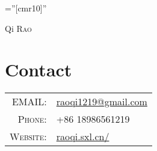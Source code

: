\documentclass[a4paper,10pt]{article}
\begin{document}

\pagestyle{empty} %

\font\fb=''[cmr10]'' %

\par{\centering
		{\Huge Qi \textsc{Rao}
	}\bigskip\par}

\section{Contact}

\begin{tabular}{rl}
    \textsc{EMAIL:} & \href{mailto:raoqi1219@gmail.com}{raoqi1219@gmail.com}\\
    \textsc{Phone:}     & +86 18986561219\\
    \textsc{Website:}     & \href{http://raoqi.sxl.cn/}{raoqi.sxl.cn/}
\end{tabular}

\end{document}

